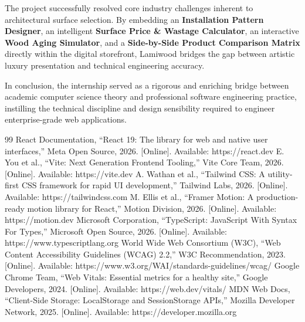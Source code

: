 \documentclass[12pt,a4paper]{report}
\begin{document}
The project successfully resolved core industry challenges inherent to architectural surface selection. By embedding an \textbf{Installation Pattern Designer}, an intelligent \textbf{Surface Price \& Wastage Calculator}, an interactive \textbf{Wood Aging Simulator}, and a \textbf{Side-by-Side Product Comparison Matrix} directly within the digital storefront, Lamiwood bridges the gap between artistic luxury presentation and technical engineering accuracy.

In conclusion, the internship served as a rigorous and enriching bridge between academic computer science theory and professional software engineering practice, instilling the technical discipline and design sensibility required to engineer enterprise-grade web applications.

\begin{thebibliography}{99}
 React Documentation, ``React 19: The library for web and native user interfaces,'' Meta Open Source, 2026. [Online]. Available: https://react.dev
 E. You et al., ``Vite: Next Generation Frontend Tooling,'' Vite Core Team, 2026. [Online]. Available: https://vite.dev
 A. Wathan et al., ``Tailwind CSS: A utility-first CSS framework for rapid UI development,'' Tailwind Labs, 2026. [Online]. Available: https://tailwindcss.com
 M. Ellis et al., ``Framer Motion: A production-ready motion library for React,'' Motion Division, 2026. [Online]. Available: https://motion.dev
 Microsoft Corporation, ``TypeScript: JavaScript With Syntax For Types,'' Microsoft Open Source, 2026. [Online]. Available: https://www.typescriptlang.org
 World Wide Web Consortium (W3C), ``Web Content Accessibility Guidelines (WCAG) 2.2,'' W3C Recommendation, 2023. [Online]. Available: https://www.w3.org/WAI/standards-guidelines/wcag/
 Google Chrome Team, ``Web Vitals: Essential metrics for a healthy site,'' Google Developers, 2024. [Online]. Available: https://web.dev/vitals/
 MDN Web Docs, ``Client-Side Storage: LocalStorage and SessionStorage APIs,'' Mozilla Developer Network, 2025. [Online]. Available: https://developer.mozilla.org
\end{thebibliography}
\end{document}
